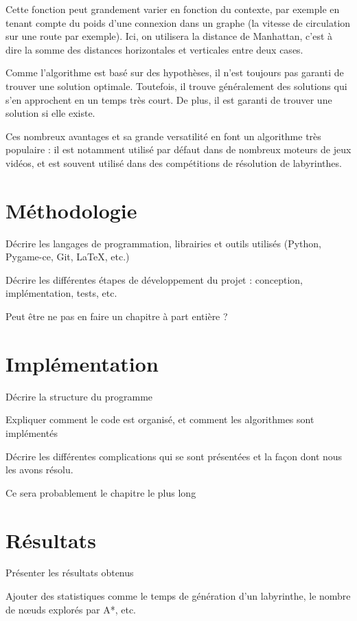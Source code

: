 \documentclass[12pt]{scrreprt} %
\begin{document}
Cette fonction peut grandement varier en fonction du contexte, par exemple en tenant compte du poids d'une connexion dans un graphe (la vitesse de circulation sur une route par exemple). Ici, on utilisera la distance de Manhattan, c'est à dire la somme des distances horizontales et verticales entre deux cases.

Comme l'algorithme est basé sur des hypothèses, il n'est toujours pas garanti de trouver une solution optimale. Toutefois, il trouve généralement des solutions qui s'en approchent en un temps très court. De plus, il est garanti de trouver une solution si elle existe.

Ces nombreux avantages et sa grande versatilité en font un algorithme très populaire : il est notamment utilisé par défaut dans de nombreux moteurs de jeux vidéos, et est souvent utilisé dans des compétitions de résolution de labyrinthes.



\chapter{Méthodologie}

Décrire les langages de programmation, librairies et outils utilisés (Python, Pygame-ce, Git, LaTeX, etc.)

Décrire les différentes étapes de développement du projet : conception, implémentation, tests, etc.

Peut être ne pas en faire un chapitre à part entière ?

\chapter{Implémentation}

Décrire la structure du programme

Expliquer comment le code est organisé, et comment les algorithmes sont implémentés

Décrire les différentes complications qui se sont présentées et la façon dont nous les avons résolu.

Ce sera probablement le chapitre le plus long

\chapter{Résultats}

Présenter les résultats obtenus

Ajouter des statistiques comme le temps de génération d'un labyrinthe, le nombre de nœuds explorés par A*, etc.
\end{document}
